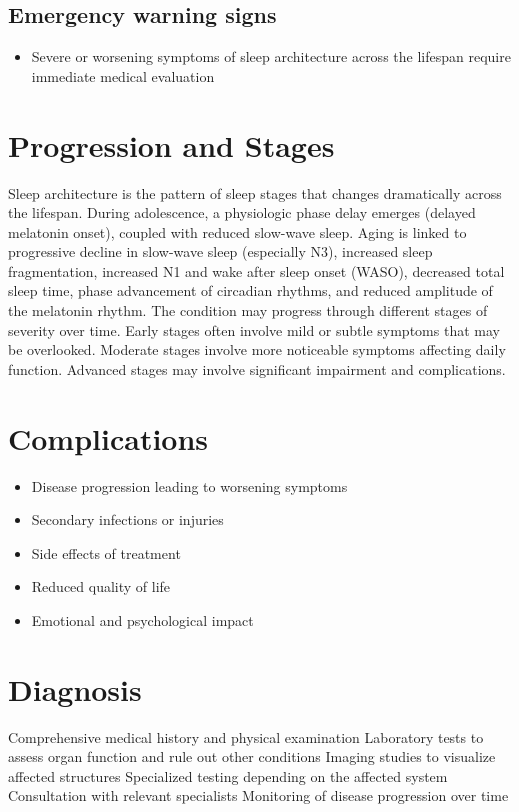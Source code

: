 \subsection{Emergency warning signs}
\begin{itemize}[noitemsep]
  \item Severe or worsening symptoms of sleep architecture across the lifespan require immediate medical evaluation
\end{itemize}
\section{Progression and Stages}
Sleep architecture is the pattern of sleep stages that changes dramatically across the lifespan. During adolescence, a physiologic phase delay emerges (delayed melatonin onset), coupled with reduced slow-wave sleep. Aging is linked to progressive decline in slow-wave sleep (especially N3), increased sleep fragmentation, increased N1 and wake after sleep onset (WASO), decreased total sleep time, phase advancement of circadian rhythms, and reduced amplitude of the melatonin rhythm. The condition may progress through different stages of severity over time. Early stages often involve mild or subtle symptoms that may be overlooked. Moderate stages involve more noticeable symptoms affecting daily function. Advanced stages may involve significant impairment and complications.
\section{Complications}
\begin{itemize}[noitemsep]
  \item Disease progression leading to worsening symptoms
  \item Secondary infections or injuries
  \item Side effects of treatment
  \item Reduced quality of life
  \item Emotional and psychological impact
\end{itemize}
\section{Diagnosis}
Comprehensive medical history and physical examination Laboratory tests to assess organ function and rule out other conditions Imaging studies to visualize affected structures Specialized testing depending on the affected system Consultation with relevant specialists Monitoring of disease progression over time

